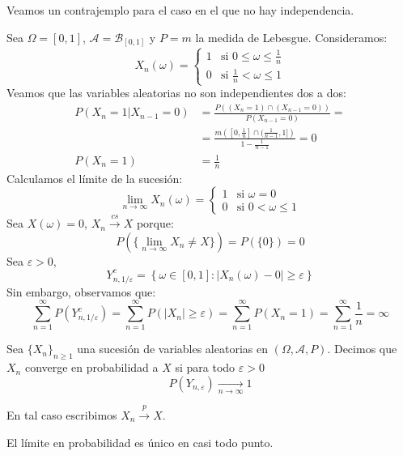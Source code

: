 \begin{example}
    Veamos un contrajemplo para el caso en el que no hay independencia.

    Sea $\Omega = [0, 1]$, $\mathcal{A} = \mathcal{B}_{[0, 1]}$ y $P = m$ la medida de Lebesgue.
    Consideramos:
    $$X_n(\omega) = \begin{cases}
            1 & \text{si } 0 \leq \omega \leq \frac{1}{n} \\
            0 & \text{si } \frac{1}{n} < \omega \leq 1
        \end{cases}$$
    Veamos que las variables aleatorias no son independientes dos a dos:
    \begin{align*}
        P(X_n = 1 | X_{n-1} = 0) & = \frac{P((X_n = 1) \cap (X_{n-1} = 0))}{P(X_{n-1} = 0)} =                             \\
                                 & = \frac{m\left([0, \frac{1}{n}] \cap (\frac{1}{n-1}, 1]\right)}{1 - \frac{1}{n-1}} = 0 \\
        P(X_n = 1)               & = \frac{1}{n}
    \end{align*}
    Calculamos el límite de la sucesión:
    $$\lim\limits_{n \to \infty} X_n(\omega) = \begin{cases}
            1 & \text{si } \omega = 0        \\
            0 & \text{si } 0 < \omega \leq 1
        \end{cases}$$
    Sea $X(\omega) = 0$, $X_n \xrightarrow{cs} X$ porque:
    $$P(\{\lim\limits_{n \to \infty} X_n \neq X\}) = P(\{0\}) = 0$$
    Sea $\varepsilon > 0$,
    $$Y_{n, 1/\varepsilon}^c = \left\{ \omega \in [0, 1] : |X_n(\omega) - 0| \geq \varepsilon \right\}$$
    Sin embargo, observamos que:
    $$\sum_{n=1}^\infty P(Y_{n, 1/\varepsilon}^c) = \sum_{n=1}^\infty P(|X_n| \geq \varepsilon) = \sum_{n=1}^\infty P(X_n = 1) = \sum_{n=1}^\infty \frac{1}{n} = \infty$$
\end{example}

\begin{definition}
    Sea $\{X_n\}_{n \geq 1}$ una sucesión de variables aleatorias en $(\Omega, \mathcal{A}, P)$.
    Decimos que $X_n$ converge en probabilidad a $X$ si para todo $\varepsilon > 0$
    $$P(Y_{n, \varepsilon}) \xrightarrow[n \to \infty]{} 1$$

    En tal caso escribimos $X_n \xrightarrow{p} X$.
\end{definition}

\begin{theorem}
    El límite en probabilidad es único en casi todo punto.
\end{theorem}

